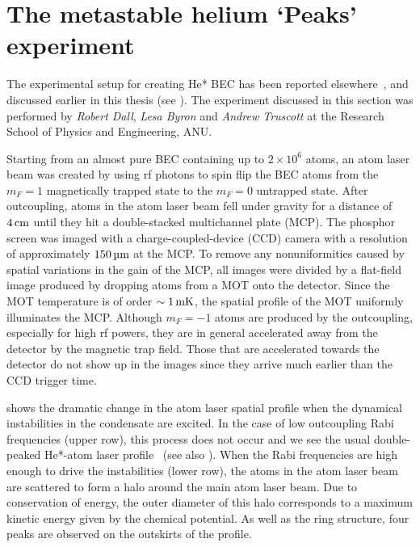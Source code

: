 \section{The metastable helium `Peaks' experiment}
\label{Peaks:ExperimentalSetup}

The experimental setup for creating He* BEC has been reported elsewhere~\citep{Dall:2007a}, and discussed earlier in this thesis (see ). The experiment discussed in this section was performed by \emph{Robert Dall}, \emph{Lesa Byron} and \emph{Andrew Truscott} at the Research School of Physics and Engineering, ANU.

Starting from an almost pure BEC containing up to $2\times 10^6$ atoms, an atom laser beam was created by using rf photons to spin flip the BEC atoms from the $m_F=1$ magnetically trapped state to the $m_F=0$ untrapped state.  After outcoupling, atoms in the atom laser beam fell under gravity for a distance of $\unit[4]{cm}$ until they hit a double-stacked multichannel plate (MCP). The phosphor screen was imaged with a charge-coupled-device (CCD) camera with a resolution of approximately $\unit[150]{\micro m}$ at the MCP. To remove any nonuniformities caused by spatial variations in the gain of the MCP, all images were divided by a flat-field image produced by dropping atoms from a MOT onto the detector. Since the MOT temperature is of order $\sim\unit[1]{mK}$, the spatial profile of the MOT uniformly illuminates the MCP. Although $m_F=-1$ atoms are produced by the outcoupling, especially for high rf powers, they are in general accelerated away from the detector by the magnetic trap field. Those that are accelerated towards the detector do not show up in the images since they arrive much earlier than the CCD trigger time.

 shows the dramatic change in the atom laser spatial profile when the dynamical instabilities in the condensate are excited.  In the case of low outcoupling Rabi frequencies (upper row), this process does not occur and we see the usual double-peaked He*-atom laser profile~\citep{Dall:2007} (see also ). When the Rabi frequencies are high enough to drive the instabilities (lower row), the atoms in the atom laser beam are scattered to form a halo around the main atom laser beam.  Due to conservation of energy, the outer diameter of this halo corresponds to a maximum kinetic energy given by the chemical potential.  As well as the ring structure, four peaks are observed on the outskirts of the profile.

